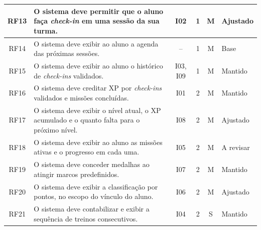 \begin{quadrolongo}
\begin{longtable}{|c|p{7.3cm}|c|c|c|p{1.6cm}|}
    RF13 & O sistema deve permitir que o aluno faça \textit{check-in} em uma sessão da sua turma. & I02 & 1 & M & Ajustado \\ \hline
    RF14 & O sistema deve exibir ao aluno a agenda das próximas sessões. & -- & 1 & M & Base \\ \hline
    RF15 & O sistema deve exibir ao aluno o histórico de \textit{check-ins} validados. & I03, I09 & 1 & M & Mantido \\ \hline
    RF16 & O sistema deve creditar XP por \textit{check-ins} validados e missões concluídas. & I01 & 2 & M & Mantido \\ \hline
    RF17 & O sistema deve exibir o nível atual, o XP acumulado e o quanto falta para o próximo nível. & I08 & 2 & M & Ajustado \\ \hline
    RF18 & O sistema deve exibir ao aluno as missões ativas e o progresso em cada uma. & I05 & 2 & M & A revisar \\ \hline
    RF19 & O sistema deve conceder medalhas ao atingir marcos predefinidos. & I07 & 2 & M & Mantido \\ \hline
    RF20 & O sistema deve exibir a classificação por pontos, no escopo do vínculo do aluno. & I06 & 2 & M & Ajustado \\ \hline
    RF21 & O sistema deve contabilizar e exibir a sequência de treinos consecutivos. & I04 & 2 & S & Mantido \\ \hline
\end{longtable}
\end{quadrolongo}

